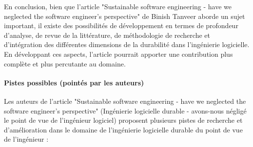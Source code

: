 En conclusion, bien que l'article "Sustainable software engineering - have we neglected the software engineer's perspective" de Binish Tanveer aborde un sujet important, il existe des possibilités de développement en termes de profondeur d'analyse, de revue de la littérature, de méthodologie de recherche et d'intégration des différentes dimensions de la durabilité dans l'ingénierie logicielle. En développant ces aspects, l'article pourrait apporter une contribution plus complète et plus percutante au domaine.

\paragraph{Pistes possibles (pointés par les auteurs)}
Les auteurs de l'article "Sustainable software engineering - have we neglected the software engineer's perspective" (Ingénierie logicielle durable - avons-nous négligé le point de vue de l'ingénieur logiciel) proposent plusieurs pistes de recherche et d'amélioration dans le domaine de l'ingénierie logicielle durable du point de vue de l'ingénieur :

